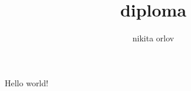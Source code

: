 \documentclass[a4paper,12pt]{article}
\begin{document}
    \author{nikita orlov}
    \title{diploma}
    \maketitle
    
    Hello world!
    
\end{document}
